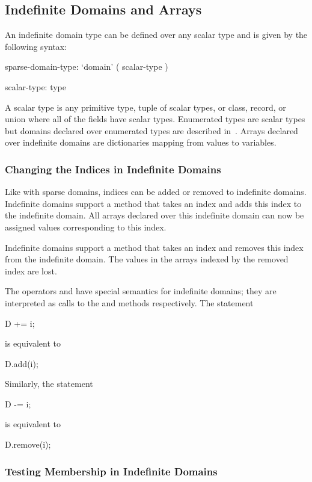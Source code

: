 \subsection{Indefinite Domains and Arrays}
\label{Indefinite_Domains_and_Arrays}

An indefinite domain type can be defined over any scalar type and is
given by the following syntax:
\begin{syntax}
sparse-domain-type:
  `domain' ( scalar-type )

scalar-type:
  type
\end{syntax}
A scalar type is any primitive type, tuple of scalar types, or class,
record, or union where all of the fields have scalar types.
Enumerated types are scalar types but domains declared over enumerated
types are described in~.  Arrays
declared over indefinite domains are dictionaries mapping from values
to variables.

\subsubsection{Changing the Indices in Indefinite Domains}

Like with sparse domains, indices can be added or removed to
indefinite domains.  Indefinite domains support a method 
that takes an index and adds this index to the indefinite domain.  All
arrays declared over this indefinite domain can now be assigned values
corresponding to this index.

Indefinite domains support a method  that takes an index
and removes this index from the indefinite domain.  The values in the
arrays indexed by the removed index are lost.

The operators \chpl{+=} and \chpl{-=} have special semantics for
indefinite domains; they are interpreted as calls to the 
and  methods respectively.  The statement
\begin{chapel}
D += i;
\end{chapel}
is equivalent to
\begin{chapel}
D.add(i);
\end{chapel}
Similarly, the statement
\begin{chapel}
D -= i;
\end{chapel}
is equivalent to
\begin{chapel}
D.remove(i);
\end{chapel}

\subsubsection{Testing Membership in Indefinite Domains}


